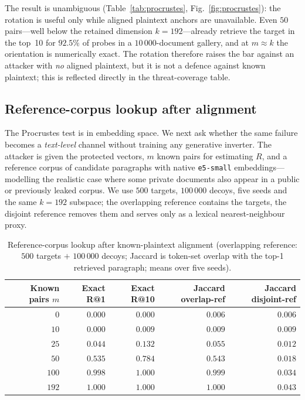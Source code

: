 \documentclass[11pt,a4paper]{article}
\begin{document}
The result is unambiguous (Table~\ref{tab:procrustes},
Fig.~\ref{fig:procrustes}): the rotation is useful only while aligned
plaintext anchors are unavailable. Even $50$ pairs---well below the
retained dimension $k=192$---already retrieve the target in the top~10 for
$92.5\%$ of probes in a $10\,000$-document gallery, and at $m\approx k$ the
orientation is numerically exact. The rotation therefore raises the bar
against an attacker with \emph{no} aligned plaintext, but it is not a
defence against known plaintext; this is reflected directly in the
threat-coverage table.

\subsection{Reference-corpus lookup after alignment}
\label{ssec:reference}

The Procrustes test is in embedding space. We next ask whether the same
failure becomes a \emph{text-level} channel without training any generative
inverter. The attacker is given the protected vectors, $m$ known pairs for
estimating $R$, and a reference corpus of candidate paragraphs with native
\texttt{e5-small} embeddings---modelling the realistic case where some
private documents also appear in a public or previously leaked corpus. We
use $500$ targets, $100\,000$ decoys, five seeds and the same $k=192$
subspace; the overlapping reference contains the targets, the disjoint
reference removes them and serves only as a lexical nearest-neighbour
proxy.

\begin{table}[tbp]
\centering
\caption{Reference-corpus lookup after known-plaintext alignment
(overlapping reference: $500$ targets $+$ $100\,000$ decoys; Jaccard is
token-set overlap with the top-1 retrieved paragraph; means over five
seeds).}
\label{tab:reference-attack}
\small
\begin{tabular}{@{}rrrrr@{}}
\toprule
Known pairs $m$ & Exact R@1 & Exact R@10 & Jaccard overlap-ref & Jaccard disjoint-ref \\ \midrule
$0$   & $0.000$ & $0.000$ & $0.006$ & $0.006$ \\
$10$  & $0.000$ & $0.009$ & $0.009$ & $0.009$ \\
$25$  & $0.044$ & $0.132$ & $0.055$ & $0.012$ \\
$50$  & $0.535$ & $0.784$ & $0.543$ & $0.018$ \\
$100$ & $0.998$ & $1.000$ & $0.999$ & $0.034$ \\
$192$ & $1.000$ & $1.000$ & $1.000$ & $0.043$ \\
\bottomrule
\end{tabular}
\end{table}
\end{document}

